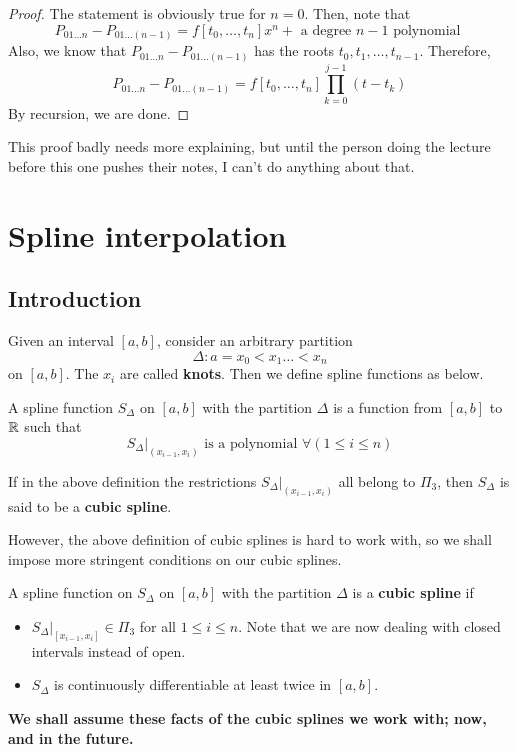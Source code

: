 \begin{proof}
  The statement is obviously true for $n = 0$. Then, note that
  \[
    P_{01\dots n} - P_{01\dots (n-1)} = f[t_0, \dots ,t_n]x^n + \text{ a degree $n-1$ polynomial }
  \]
  Also, we know that $P_{01\dots n} - P_{01\dots (n-1)}$ has the roots $t_0, t_1, \dots ,t_{n-1}$. Therefore,
  \[
    P_{01\dots n} - P_{01\dots (n-1)} = f[t_0, \dots ,t_n]\prod_{k = 0}^{j-1}\left(t - t_{k} \right)
  \]
  By recursion, we are done.
\end{proof}
\begin{rmk}
This proof badly needs more explaining, but until the person doing the lecture before this one pushes their notes, I can't do anything about that.
\end{rmk}

\section{Spline interpolation}

\subsection{Introduction}

Given an interval $[a, b]$, consider an arbitrary partition
\[
  \Delta \colon a = x_0 < x_1 \dots < x_n
\]
on $[a, b]$. The $x_i$ are called \textbf{knots}. Then we define spline functions as below.
\begin{defn}
  A spline function $S_\Delta$ on $[a, b]$ with the partition $\Delta$ is a function from $[a, b]$ to $\mathbb{R}$ such that
  \[
    S_\Delta \vert_{(x_{i-1}, x_{i})} \text{ is a polynomial } \forall(1 \leq i \leq n)
  \]
\end{defn}

\begin{defn}
  If in the above definition the restrictions $S_\Delta \vert_{(x_{i-1}, x_{i})}$ all belong to $\Pi_3$, then $S_\Delta$ is said to be a \textbf{cubic spline}.
\end{defn}

However, the above definition of cubic splines is hard to work with, so we shall impose more stringent conditions on our cubic splines.

\begin{defn}
  A spline function on $S_\Delta$ on $[a, b]$ with the partition $\Delta$ is a \textbf{cubic spline} if
  \begin{itemize}
  \item
    $S_\Delta \vert_{[x_{i-1}, x_i]} \in \Pi_3$ for all $1 \leq i \leq n$. Note that we are now dealing with closed intervals instead of open.
  \item
    $S_\Delta$ is continuously differentiable at least twice in $[a, b]$.
  \end{itemize}
  \textbf{We shall assume these facts of the cubic splines we work with; now, and in the future.}
\end{defn}

